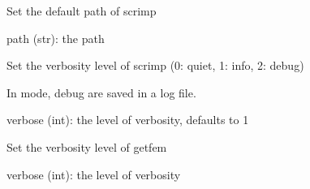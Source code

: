 \documentclass[letterpaper,10pt,english]{sphinxmanual}
\begin{document}
\begin{fulllineitems}
\label{\detokenize{scrimp.utils:scrimp.utils.config.set_paths}}
\pysigstartsignatures
\pysiglinewithargsret
{}
{}
{}
\pysigstopsignatures
\sphinxAtStartPar
Set the default path of scrimp
\begin{description}
\sphinxAtStartPar
path (str): the path

\end{description}

\end{fulllineitems}


\begin{fulllineitems}
\label{\detokenize{scrimp.utils:scrimp.utils.config.set_verbose}}
\pysigstartsignatures
\pysiglinewithargsret
{}
{}
{}
\pysigstopsignatures
\sphinxAtStartPar
Set the verbosity level of scrimp (0: quiet, 1: info, 2: debug)

\sphinxAtStartPar
In  mode, debug are saved in a log file.
\begin{description}
\sphinxAtStartPar
verbose (int): the level of verbosity, defaults to 1

\end{description}

\end{fulllineitems}


\begin{fulllineitems}
\label{\detokenize{scrimp.utils:scrimp.utils.config.set_verbose_gf}}
\pysigstartsignatures
\pysiglinewithargsret
{}
{}
{}
\pysigstopsignatures
\sphinxAtStartPar
Set the verbosity level of getfem
\begin{description}
\sphinxAtStartPar
verbose (int): the level of verbosity

\end{description}

\end{fulllineitems}
\end{document}
